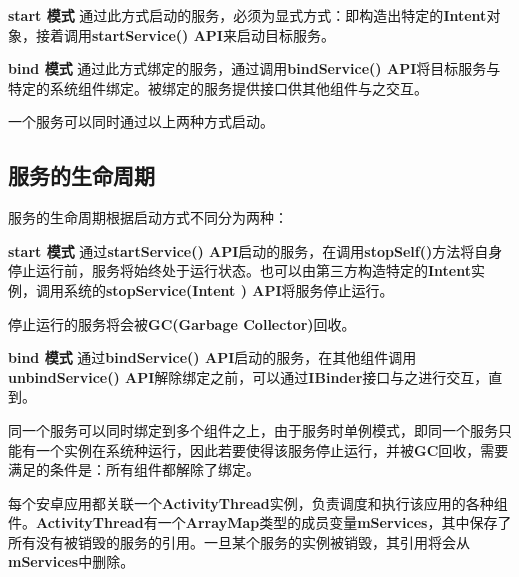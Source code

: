 \textbf{start 模式 } 通过此方式启动的服务，必须为显式方式：即构造出特定的\textbf{Intent}对象，接着调用\textbf{startService() API}来启动目标服务。

\textbf{bind 模式 } 通过此方式绑定的服务，通过调用\textbf{bindService() API}将目标服务与特定的系统组件绑定。被绑定的服务提供接口供其他组件与之交互。

一个服务可以同时通过以上两种方式启动。

\subsection{服务的生命周期}
服务的生命周期根据启动方式不同分为两种\cite{service}：

\textbf{start 模式 } 通过\textbf{startService() API}启动的服务，在调用\textbf{stopSelf()}方法将自身停止运行前，服务将始终处于运行状态。也可以由第三方构造特定的\textbf{Intent}实例，调用系统的\textbf{stopService(Intent ) API}将服务停止运行。

停止运行的服务将会被\textbf{GC(Garbage Collector)}回收。

\textbf{bind 模式 } 通过\textbf{bindService() API}启动的服务，在其他组件调用\textbf{unbindService() API}解除绑定之前，可以通过\textbf{IBinder}接口与之进行交互，直到。

同一个服务可以同时绑定到多个组件之上，由于服务时单例模式，即同一个服务只能有一个实例在系统种运行，因此若要使得该服务停止运行，并被\textbf{GC}回收，需要满足的条件是：所有组件都解除了绑定。

每个安卓应用都关联一个\textbf{ActivityThread}实例，负责调度和执行该应用的各种组件。\textbf{ActivityThread}有一个\textbf{ArrayMap}类型的成员变量\textbf{mServices}，其中保存了所有没有被销毁的服务的引用。一旦某个服务的实例被销毁，其引用将会从\textbf{mServices}中删除。

